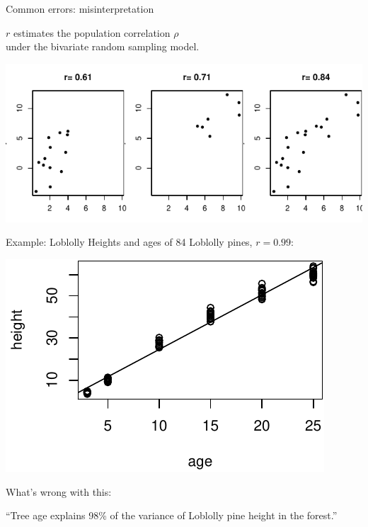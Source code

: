 \begin{frame}{Common errors: misinterpretation}
    
  $r$ estimates the \alert{population correlation} $\rho$ \\
  under the bivariate random sampling model.

  \vspace{2em}


      \begin{center}
        \includegraphics[width=\textwidth]{r-interp}
      \end{center}


\end{frame}

\begin{frame}{Example: Loblolly}
  Heights and ages of 84 Loblolly pines, \alert{$r=0.99$}:
  \begin{center}
    \includegraphics{loblolly-age-height}
  \end{center}

  \vspace{1em}
  
  What's wrong with this:

  ``Tree age explains 98\% of the variance of Loblolly pine height in the forest.''

\end{frame}



